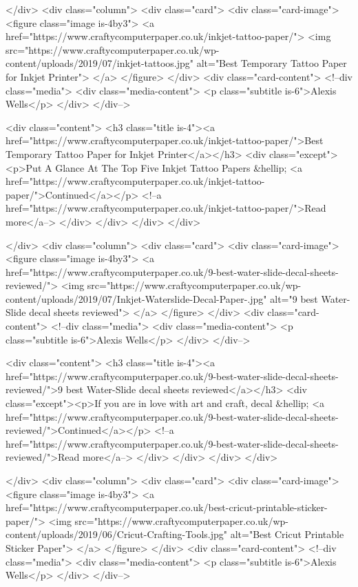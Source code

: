     </div>
          <div class="column">
      <div class="card">
        <div class="card-image">
          <figure class="image is-4by3">
          <a href="https://www.craftycomputerpaper.co.uk/inkjet-tattoo-paper/">
                          <img src="https://www.craftycomputerpaper.co.uk/wp-content/uploads/2019/07/inkjet-tattoos.jpg" alt="Best Temporary Tattoo Paper for Inkjet Printer">
                      </a>
          </figure>
        </div>
        <div class="card-content">
          <!--div class="media">
            <div class="media-content">
              <p class="subtitle is-6">Alexis Wells</p>
            </div>
          </div-->

          <div class="content">
            <h3 class="title is-4"><a href="https://www.craftycomputerpaper.co.uk/inkjet-tattoo-paper/">Best Temporary Tattoo Paper for Inkjet Printer</a></h3>
            <div class="except"><p>Put A Glance At The Top Five Inkjet Tattoo Papers &hellip; <a href="https://www.craftycomputerpaper.co.uk/inkjet-tattoo-paper/">Continued</a></p>
 <!--a href="https://www.craftycomputerpaper.co.uk/inkjet-tattoo-paper/">Read more</a--> </div>
          </div>
        </div>
      </div>

    </div>
          <div class="column">
      <div class="card">
        <div class="card-image">
          <figure class="image is-4by3">
          <a href="https://www.craftycomputerpaper.co.uk/9-best-water-slide-decal-sheets-reviewed/">
                          <img src="https://www.craftycomputerpaper.co.uk/wp-content/uploads/2019/07/Inkjet-Waterslide-Decal-Paper-.jpg" alt="9 best Water-Slide decal sheets reviewed">
                      </a>
          </figure>
        </div>
        <div class="card-content">
          <!--div class="media">
            <div class="media-content">
              <p class="subtitle is-6">Alexis Wells</p>
            </div>
          </div-->

          <div class="content">
            <h3 class="title is-4"><a href="https://www.craftycomputerpaper.co.uk/9-best-water-slide-decal-sheets-reviewed/">9 best Water-Slide decal sheets reviewed</a></h3>
            <div class="except"><p>If you are in love with art and craft, decal &hellip; <a href="https://www.craftycomputerpaper.co.uk/9-best-water-slide-decal-sheets-reviewed/">Continued</a></p>
 <!--a href="https://www.craftycomputerpaper.co.uk/9-best-water-slide-decal-sheets-reviewed/">Read more</a--> </div>
          </div>
        </div>
      </div>

    </div>
          <div class="column">
      <div class="card">
        <div class="card-image">
          <figure class="image is-4by3">
          <a href="https://www.craftycomputerpaper.co.uk/best-cricut-printable-sticker-paper/">
                          <img src="https://www.craftycomputerpaper.co.uk/wp-content/uploads/2019/06/Cricut-Crafting-Tools.jpg" alt="Best Cricut Printable Sticker Paper">
                      </a>
          </figure>
        </div>
        <div class="card-content">
          <!--div class="media">
            <div class="media-content">
              <p class="subtitle is-6">Alexis Wells</p>
            </div>
          </div-->

